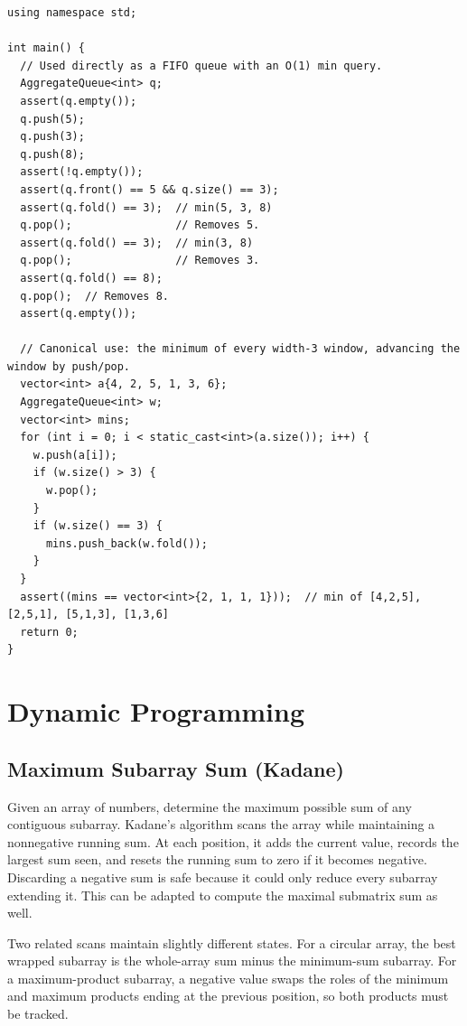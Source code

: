 \begin{lstlisting}[style=cpp]
using namespace std;

int main() {
  // Used directly as a FIFO queue with an O(1) min query.
  AggregateQueue<int> q;
  assert(q.empty());
  q.push(5);
  q.push(3);
  q.push(8);
  assert(!q.empty());
  assert(q.front() == 5 && q.size() == 3);
  assert(q.fold() == 3);  // min(5, 3, 8)
  q.pop();                // Removes 5.
  assert(q.fold() == 3);  // min(3, 8)
  q.pop();                // Removes 3.
  assert(q.fold() == 8);
  q.pop();  // Removes 8.
  assert(q.empty());

  // Canonical use: the minimum of every width-3 window, advancing the window by push/pop.
  vector<int> a{4, 2, 5, 1, 3, 6};
  AggregateQueue<int> w;
  vector<int> mins;
  for (int i = 0; i < static_cast<int>(a.size()); i++) {
    w.push(a[i]);
    if (w.size() > 3) {
      w.pop();
    }
    if (w.size() == 3) {
      mins.push_back(w.fold());
    }
  }
  assert((mins == vector<int>{2, 1, 1, 1}));  // min of [4,2,5], [2,5,1], [5,1,3], [1,3,6]
  return 0;
}
\end{lstlisting}

\section{\texorpdfstring{Dynamic Programming}{1.3 Dynamic Programming}}
\setcounter{section}{3}
\setcounter{subsection}{0}
\subsection{Maximum Subarray Sum (Kadane)}
\label{sec:1.3.1}
Given an array of numbers, determine the maximum possible sum of any contiguous subarray. Kadane's algorithm scans the array while maintaining a nonnegative running sum. At each position, it adds the current value, records the largest sum seen, and resets the running sum to zero if it becomes negative. Discarding a negative sum is safe because it could only reduce every subarray extending it. This can be adapted to compute the maximal submatrix sum as well.

Two related scans maintain slightly different states. For a circular array, the best wrapped subarray is the whole-array sum minus the minimum-sum subarray. For a maximum-product subarray, a negative value swaps the roles of the minimum and maximum products ending at the previous position, so both products must be tracked.

